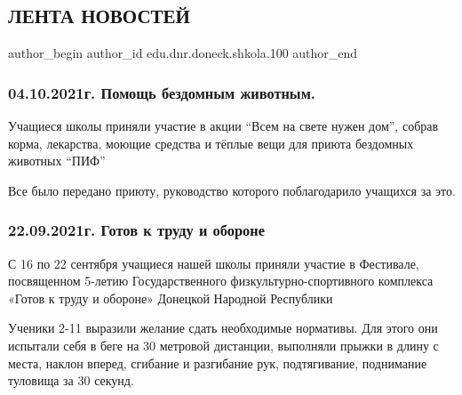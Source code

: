  
 
 
 
 
\subsection{ЛЕНТА НОВОСТЕЙ}
\label{sec:30_12_2021.edu.dnr.doneck.shkola.100.1.novosti}

\ifcmt
 author_begin
   author_id edu.dnr.doneck.shkola.100
 author_end
\fi

\subsubsection{04.10.2021г. Помощь бездомным животным.}


Учащиеся школы приняли участие в акции \enquote{Всем на свете нужен дом}, собрав корма,
лекарства, моющие средства и тёплые вещи для приюта бездомных животных \enquote{ПИФ}

Все было передано приюту, руководство которого поблагодарило  учащихся за это.

\subsubsection{22.09.2021г. Готов к труду и обороне}

С 16 по 22 сентября учащиеся нашей школы приняли участие в Фестивале,
посвященном 5-летию Государственного физкультурно-спортивного комплекса «Готов
к труду и обороне» Донецкой Народной Республики

Ученики 2-11 выразили желание сдать необходимые нормативы. Для этого они
испытали себя в беге на 30 метровой дистанции, выполняли прыжки в длину с
места, наклон вперед, сгибание и разгибание рук, подтягивание, поднимание
туловища за 30 секунд.


